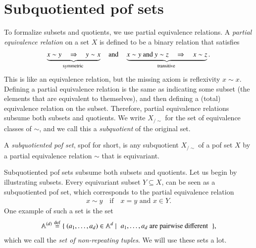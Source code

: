 \exercisepart


\section{Subquotiented pof sets}
\label{sec:subquotiented-pof-sets}
To formalize subsets and quotients, we use partial equivalence relations. 
    A \emph{partial equivalence relation} on a set $X$ is defined to be a binary relation that satisfies 
    \begin{align*}
        \myunderbrace{x \sim y \quad \Rightarrow \quad y \sim x}{symmetric} 
        \quad \text{and} \quad
        \myunderbrace{x \sim y  \text{ and }  y \sim z \quad \Rightarrow
        \quad x \sim z}{transitive}.
    \end{align*}
    This is like an equivalence relation, but the missing axiom is  reflexivity $x\sim x$. Defining a partial equivalence relation is the same as indicating some subset (the elements that are equivalent to themselves), and then defining a (total) equivalence relation on the subset. Therefore, partial equivalence relations subsume both subsets and quotients. 
     We write $X_{/\sim}$ for the set of equivalence classes of $\sim$, and we call this a \emph{subquotient} of the original set.

    \begin{definition}\label{def:subquotiented-pof-set}
        A \emph{subquotiented pof set}, spof for short, is any subquotient $X_{/\sim}$ of a pof set $X$ by a partial equivalence relation $\sim$ that is equivariant. 
    \end{definition}

    \begin{myexample}\label{ex:subquotiented-as-subsets} Subquotiented pof sets subsume both subsets and quotients. Let us begin by illustrating subsets.
        Every equivariant subset $Y \subseteq X$, can be seen as a subquotiented pof set, which corresponds to the partial equivalence relation 
        \begin{align*}
            x \sim y \quad \text{if} \quad x = y \text{ and } x \in Y.
        \end{align*}
        One example of such a set is the set
        \begin{align*}
        \atoms^{(d)} \eqdef 
        \setbuild{(a_1,\ldots,a_d) \in \atoms^d}{$a_1,\ldots,a_d$ are pairwise different},
        \end{align*} 
        which we call the \emph{set of non-repeating tuples}. We will use these sets a lot.
    \end{myexample}


